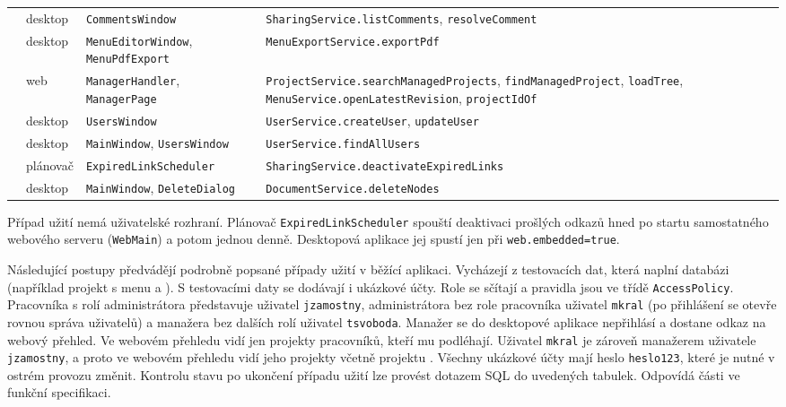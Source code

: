 {\begin{xltabular}{\textwidth}{@{}p{1.1cm}p{1.9cm}>{\raggedright\arraybackslash}p{4.6cm}>{\raggedright\arraybackslash}X@{}}
\textbf{} & desktop & \texttt{CommentsWindow} & \texttt{SharingService.listComments}, \texttt{resolveComment} \\
 & desktop & \texttt{MenuEditorWindow}, \texttt{MenuPdfExport} & \texttt{MenuExportService.exportPdf} \\
 & web & \texttt{ManagerHandler}, \texttt{ManagerPage} & \texttt{ProjectService.searchManagedProjects}, \texttt{findManagedProject}, \texttt{loadTree}, \texttt{MenuService.openLatestRevision}, \texttt{projectIdOf} \\
\textbf{} & desktop & \texttt{UsersWindow} & \texttt{UserService.createUser}, \texttt{updateUser} \\
 & desktop & \texttt{MainWindow}, \texttt{UsersWindow} & \texttt{UserService.findAllUsers} \\
 & plánovač & \texttt{ExpiredLinkScheduler} & \texttt{SharingService.deactivateExpiredLinks} \\
 & desktop & \texttt{MainWindow}, \texttt{DeleteDialog} & \texttt{DocumentService.deleteNodes} \\
\bottomrule
\end{xltabular}
}

Případ užití  nemá uživatelské rozhraní. Plánovač \texttt{ExpiredLinkScheduler} spouští deaktivaci prošlých odkazů hned po startu samostatného webového serveru (\texttt{WebMain}) a potom jednou denně. Desktopová aplikace jej spustí jen při \texttt{web.embedded=true}.

Následující postupy předvádějí podrobně popsané případy užití v běžící aplikaci. Vycházejí z testovacích dat, která naplní databázi (například projekt  s menu  a ). S testovacími daty se dodávají i ukázkové účty. Role se sčítají a pravidla jsou ve třídě \texttt{AccessPolicy}. Pracovníka s rolí administrátora představuje uživatel \texttt{jzamostny}, administrátora bez role pracovníka uživatel \texttt{mkral} (po přihlášení se otevře rovnou správa uživatelů) a manažera bez dalších rolí uživatel \texttt{tsvoboda}. Manažer se do desktopové aplikace nepřihlásí a dostane odkaz na webový přehled. Ve webovém přehledu vidí jen projekty pracovníků, kteří mu podléhají. Uživatel \texttt{mkral} je zároveň manažerem uživatele \texttt{jzamostny}, a proto ve webovém přehledu vidí jeho projekty včetně projektu . Všechny ukázkové účty mají heslo \texttt{heslo123}, které je nutné v ostrém provozu změnit. Kontrolu stavu po ukončení případu užití lze provést dotazem SQL do uvedených tabulek. Odpovídá části  ve funkční specifikaci.

